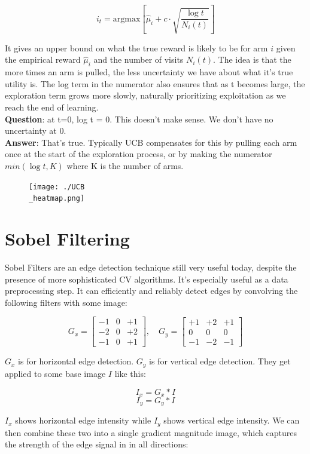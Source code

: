 \documentclass[12pt]{article}
\begin{document}
\[
i_t = \text{argmax}\left[\hat{\mu}_i + c\cdot \sqrt{\frac{\log t}{N_i(t)}} \right]
\]

It gives an upper bound on what the true reward is likely to be for arm \(i\) given the empirical reward \(\hat{\mu}_i\) and the number of visits \(N_i(t)\). The idea is that the more times an arm is pulled, the less uncertainty we have about what it's true utility is. The log term in the numerator also ensures that as t becomes large, the exploration term grows more slowly, naturally prioritizing exploitation as we reach the end of learning.\\
\textbf{Question}: at t=0, log t = 0. This doesn't make sense. We don't have no uncertainty at 0. \\
\textbf{Answer}: That's true. Typically UCB compensates for this by pulling each arm once at the start of the exploration process, or by making the numerator \(min(\log t, K)\) where K is the number of arms. 

\begin{figure}[H]
    \centering
    \texttt{[image: ./UCB\\\_heatmap.png]} %
\end{figure}
\section{Sobel Filtering}
Sobel Filters are an edge detection technique still very useful today, despite the presence of more sophisticated CV algorithms. It's especially useful as a data preprocessing step. It can efficiently and reliably detect edges by convolving the following filters with some image:

\[
G_x = \begin{bmatrix} -1 & 0 & +1 \\ -2 & 0 & +2 \\ -1 & 0 & +1 \end{bmatrix}, \quad 
G_y = \begin{bmatrix} +1 & +2 & +1 \\ 0 & 0 & 0 \\ -1 & -2 & -1 \end{bmatrix}
\]

\(G_x\) is for horizontal edge detection. \(G_y\) is for vertical edge detection. They get applied to some base image \(I\) like this: 

\[I_x = G_x \ast I\]
\[I_y = G_y \ast I\]

\(I_x\) shows horizontal edge intensity while \(I_y\) shows vertical edge intensity. We can then combine these two into a single gradient magnitude image, which captures the strength of the edge signal in in all directions:
\end{document}
